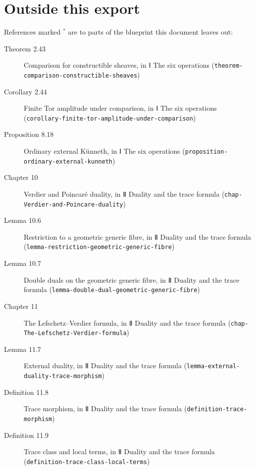 \documentclass[11pt]{article}
\newcommand{\bpslug}[1]{\texttt{#1}}
\begin{document}
\section*{Outside this export}
References marked \ensuremath{{}^\ast} are to parts of the blueprint this document leaves out:
\begin{description}
\item[Theorem 2.43] Comparison for constructible sheaves, in Ⅰ The six operations (\bpslug{theorem-{}\allowbreak{}comparison-{}\allowbreak{}constructible-{}\allowbreak{}sheaves})
\item[Corollary 2.44] Finite Tor amplitude under comparison, in Ⅰ The six operations (\bpslug{corollary-{}\allowbreak{}finite-{}\allowbreak{}tor-{}\allowbreak{}amplitude-{}\allowbreak{}under-{}\allowbreak{}comparison})
\item[Proposition 8.18] Ordinary external Künneth, in Ⅰ The six operations (\bpslug{proposition-{}\allowbreak{}ordinary-{}\allowbreak{}external-{}\allowbreak{}kunneth})
\item[Chapter 10] Verdier and Poincaré duality, in Ⅱ Duality and the trace formula (\bpslug{chap-{}\allowbreak{}Verdier-{}\allowbreak{}and-{}\allowbreak{}Poincare-{}\allowbreak{}duality})
\item[Lemma 10.6] Restriction to a geometric generic fibre, in Ⅱ Duality and the trace formula (\bpslug{lemma-{}\allowbreak{}restriction-{}\allowbreak{}geometric-{}\allowbreak{}generic-{}\allowbreak{}fibre})
\item[Lemma 10.7] Double duals on the geometric generic fibre, in Ⅱ Duality and the trace formula (\bpslug{lemma-{}\allowbreak{}double-{}\allowbreak{}dual-{}\allowbreak{}geometric-{}\allowbreak{}generic-{}\allowbreak{}fibre})
\item[Chapter 11] The Lefschetz–Verdier formula, in Ⅱ Duality and the trace formula (\bpslug{chap-{}\allowbreak{}The-{}\allowbreak{}Lefschetz-{}\allowbreak{}Verdier-{}\allowbreak{}formula})
\item[Lemma 11.7] External duality, in Ⅱ Duality and the trace formula (\bpslug{lemma-{}\allowbreak{}external-{}\allowbreak{}duality-{}\allowbreak{}trace-{}\allowbreak{}morphism})
\item[Definition 11.8] Trace morphism, in Ⅱ Duality and the trace formula (\bpslug{definition-{}\allowbreak{}trace-{}\allowbreak{}morphism})
\item[Definition 11.9] Trace class and local terms, in Ⅱ Duality and the trace formula (\bpslug{definition-{}\allowbreak{}trace-{}\allowbreak{}class-{}\allowbreak{}local-{}\allowbreak{}terms})

\end{description}
\end{document}
